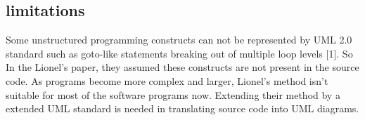 \documentclass{article}
\begin{document}
\subsection{limitations}

Some unstructured programming constructs can not be represented by UML 2.0 standard such as goto-like statements breaking out of multiple loop levels [1]. So In the Lionel's paper, they assumed these constructs are not present in the source code. As programs become more complex and larger, Lionel's method isn't suitable for most of the software programs now. Extending their method by a extended UML standard is needed in translating source code into UML diagrams.
\end{document}
